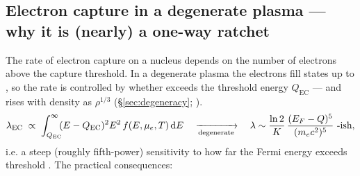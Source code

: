 \subsection{Electron capture in a degenerate plasma --- why it is (nearly) a one-way ratchet}
\label{sec:ecratchet}

The rate of electron capture on a nucleus depends on the number of electrons
above the capture threshold. In a degenerate plasma the electrons fill states
up to \eF, so the rate is controlled by whether \eF{} exceeds the threshold
energy $Q_{\mathrm{EC}}$ --- and \eF{} rises with density as $\rho^{1/3}$
(\S\ref{sec:degeneracy}; \citealt[\S IV]{langanke2003a}).
%
\begin{equation}
\lambda_{\mathrm{EC}} \;\propto\; \int_{Q_{\mathrm{EC}}}^{\infty}
\!\!(E - Q_{\mathrm{EC}})^{2}E^{2}\,f(E,\mu_e,T)\,\dd E
\quad\xrightarrow[\text{degenerate}]{}\quad
\lambda \sim \frac{\ln 2}{K}\,\frac{(\eF - Q)^{5}}{(m_ec^2)^5}\ \text{-ish},
\label{eq:lambdaec}
\end{equation}
%
i.e. a steep (roughly fifth-power) sensitivity to how far the Fermi energy
exceeds threshold .
The practical consequences:

